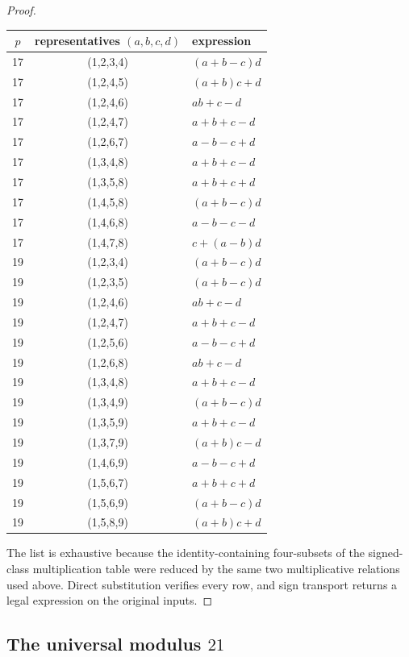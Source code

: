 \begin{proof}
\small
\begin{center}
\begin{tabular}{@{}ccl@{}}
\toprule
$p$ & representatives $(a,b,c,d)$ & expression \\
\midrule
17&(1,2,3,4)&$(a+b-c)d$\\
17&(1,2,4,5)&$(a+b)c+d$\\
17&(1,2,4,6)&$ab+c-d$\\
17&(1,2,4,7)&$a+b+c-d$\\
17&(1,2,6,7)&$a-b-c+d$\\
17&(1,3,4,8)&$a+b+c-d$\\
17&(1,3,5,8)&$a+b+c+d$\\
17&(1,4,5,8)&$(a+b-c)d$\\
17&(1,4,6,8)&$a-b-c-d$\\
17&(1,4,7,8)&$c+(a-b)d$\\
\midrule
19&(1,2,3,4)&$(a+b-c)d$\\
19&(1,2,3,5)&$(a+b-c)d$\\
19&(1,2,4,6)&$ab+c-d$\\
19&(1,2,4,7)&$a+b+c-d$\\
19&(1,2,5,6)&$a-b-c+d$\\
19&(1,2,6,8)&$ab+c-d$\\
19&(1,3,4,8)&$a+b+c-d$\\
19&(1,3,4,9)&$(a+b-c)d$\\
19&(1,3,5,9)&$a+b+c-d$\\
19&(1,3,7,9)&$(a+b)c-d$\\
19&(1,4,6,9)&$a-b-c+d$\\
19&(1,5,6,7)&$a+b+c+d$\\
19&(1,5,6,9)&$(a+b-c)d$\\
19&(1,5,8,9)&$(a+b)c+d$\\
\bottomrule
\end{tabular}
\end{center}
\normalsize
The list is exhaustive because the identity-containing four-subsets of the
signed-class multiplication table were reduced by the same two
multiplicative relations used above.  Direct substitution verifies every
row, and sign transport returns a legal expression on the original inputs.
\end{proof}

\subsection{\texorpdfstring{The universal modulus $21$}{The universal modulus 21}}\label{app:p21}

